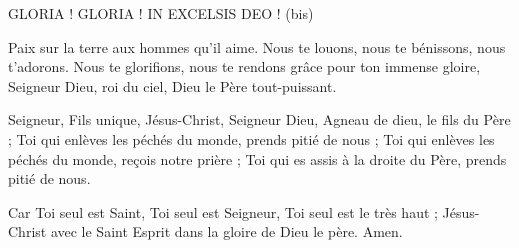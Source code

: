GLORIA ! GLORIA ! IN EXCELSIS DEO ! (bis)

Paix sur la terre aux hommes qu’il aime.
Nous te louons, nous te bénissons, nous t’adorons.
Nous te glorifions, nous te rendons grâce pour ton immense gloire,
Seigneur Dieu, roi du ciel, Dieu le Père tout-puissant.

Seigneur, Fils unique, Jésus-Christ,
Seigneur Dieu, Agneau de dieu, le fils du Père ;
Toi qui enlèves les péchés du monde, prends pitié de nous ;
Toi qui enlèves les péchés du monde, reçois notre prière ;
Toi qui es assis à la droite du Père, prends pitié de nous.

Car Toi seul est Saint, Toi seul est Seigneur,
Toi seul est le très haut ; Jésus-Christ avec le Saint Esprit
dans la gloire de Dieu le père. Amen.
